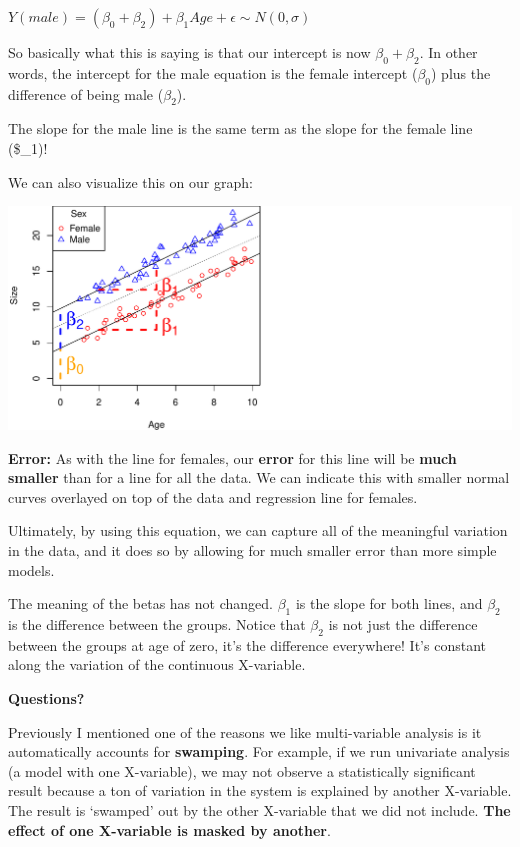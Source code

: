 \documentclass[
]{article}
\begin{document}
\textbf{\(Y(male) = (\beta_0 + \beta_2) + \beta_1 Age + \epsilon \sim N(0, \sigma)\)}

So basically what this is saying is that our intercept is now
\(\beta_0 + \beta_2\). In other words, the intercept for the male
equation is the female intercept (\(\beta_0\)) plus the difference of
being male (\(\beta_2\)).

The slope for the male line is the same term as the slope for the female
line (\$\beta\_1)!

We can also visualize this on our graph:

\includegraphics{lecture_12_files/figure-latex/example3-1.pdf}

\textbf{Error:} As with the line for females, our \textbf{error} for
this line will be \textbf{much smaller} than for a line for all the
data. We can indicate this with smaller normal curves overlayed on top
of the data and regression line for females.

Ultimately, by using this equation, we can capture all of the meaningful
variation in the data, and it does so by allowing for much smaller error
than more simple models.

The meaning of the betas has not changed. \(\beta_1\) is the slope for
both lines, and \(\beta_2\) is the difference between the groups. Notice
that \(\beta_2\) is not just the difference between the groups at age of
zero, it's the difference everywhere! It's constant along the variation
of the continuous X-variable.

\textbf{Questions?}

Previously I mentioned one of the reasons we like multi-variable
analysis is it automatically accounts for \textbf{swamping}. For
example, if we run univariate analysis (a model with one X-variable), we
may not observe a statistically significant result because a ton of
variation in the system is explained by another X-variable. The result
is `swamped' out by the other X-variable that we did not include.
\textbf{The effect of one X-variable is masked by another}.
\end{document}
